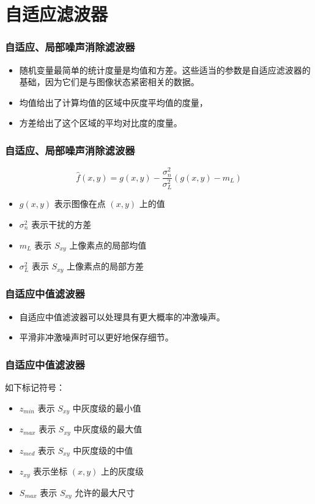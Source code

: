 \documentclass{beamer}
\begin{document}
\section{自适应滤波器}
\label{sec-7}
\begin{frame}
\frametitle{自适应、局部噪声消除滤波器}
\label{sec-7-1}

\begin{itemize}
\item 随机变量最简单的统计度量是均值和方差。这些适当的参数是自适应滤波器的基础，因为它们是与图像状态紧密相关的数据。
\item 均值给出了计算均值的区域中灰度平均值的度量，
\item 方差给出了这个区域的平均对比度的度量。
\end{itemize}
\end{frame}
\begin{frame}
\frametitle{自适应、局部噪声消除滤波器}
\label{sec-7-2}

\[ \hat f(x,y)=g(x,y)-\frac{\sigma_n^2}{\sigma_L^2}(g(x,y)-m_L) \]

\begin{itemize}
\item $g(x,y)$ 表示图像在点 $(x,y)$ 上的值
\item $\sigma^2_n$ 表示干扰的方差
\item $m_L$ 表示 $S_{xy}$ 上像素点的局部均值
\item $\sigma_L^2$ 表示 $S_{xy}$ 上像素点的局部方差
\end{itemize}
\end{frame}
\begin{frame}
\frametitle{自适应中值滤波器}
\label{sec-7-3}


\begin{itemize}
\item 自适应中值滤波器可以处理具有更大概率的冲激噪声。
\item 平滑非冲激噪声时可以更好地保存细节。
\end{itemize}
\end{frame}
\begin{frame}
\frametitle{自适应中值滤波器}
\label{sec-7-4}

如下标记符号：
\begin{itemize}
\item $z_{min}$ 表示 $S_{xy}$ 中灰度级的最小值
\item $z_{max}$ 表示 $S_{xy}$ 中灰度级的最大值
\item $z_{med}$ 表示 $S_{xy}$ 中灰度级的中值
\item $z_{xy}$ 表示坐标 $(x,y)$ 上的灰度级
\item $S_{max}$ 表示 $S_{xy}$ 允许的最大尺寸
\end{itemize}
\end{frame}
\end{document}
